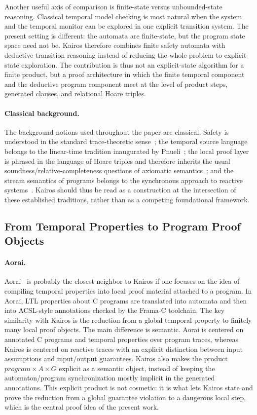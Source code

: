 \documentclass[11pt,a4paper]{article}
\begin{document}
Another useful axis of comparison is finite-state versus unbounded-state
reasoning. Classical temporal model checking is most natural when the system
and the temporal monitor can be explored in one explicit transition system. The
present setting is different: the automata are finite-state, but the program
state space need not be. Kairos therefore combines finite safety automata with
deductive transition reasoning instead of reducing the whole problem to
explicit-state exploration. The contribution is thus not an explicit-state
algorithm for a finite product, but a proof architecture in which the finite
temporal component and the deductive program component meet at the level of
product steps, generated clauses, and relational Hoare triples.

\paragraph{Classical background.}
The background notions used throughout the paper are classical. Safety is
understood in the standard trace-theoretic sense~\cite{alpern-schneider}; the
temporal source language belongs to the linear-time tradition inaugurated by
Pnueli~\cite{pnueli-1977}; the local proof layer is phrased in the language of
Hoare triples and therefore inherits the usual soundness/relative-completeness
questions of axiomatic semantics~\cite{hoare-1969,cook-1978}; and the stream
semantics of programs belongs to the synchronous approach to reactive
systems~\cite{halbwachs-1991,benveniste-sync,lustre-pvs}. Kairos should thus be
read as a construction at the intersection of these established traditions,
rather than as a competing foundational framework.

\subsection{From Temporal Properties to Program Proof Objects}

\paragraph{Aorai.}
Aorai~\cite{aorai-manual,stouls-groslambert-2009} is probably the closest
neighbor to Kairos if one focuses on the idea of compiling temporal properties
into local proof material attached to a program. In Aorai, LTL properties about
C programs are translated into automata and then into ACSL-style annotations
checked by the Frama-C toolchain. The key similarity with Kairos is the
reduction from a global temporal property to finitely many local proof
objects. The main difference is semantic. Aorai is centered on annotated C
programs and temporal properties over program traces, whereas Kairos is
centered on reactive traces with an explicit distinction between input
assumptions and input/output guarantees. Kairos also makes the product
\(program \times A \times G\) explicit as a semantic object, instead of keeping
the automaton/program synchronization mostly implicit in the generated
annotations. This explicit product is not cosmetic: it is what lets Kairos
state and prove the reduction from a global guarantee violation to a dangerous
local step, which is the central proof idea of the present work.
\end{document}
